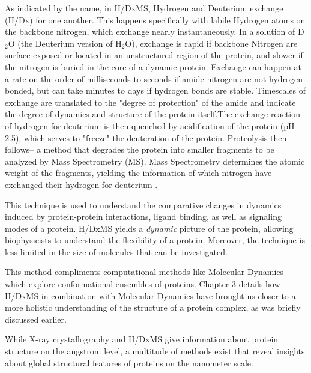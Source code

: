 \documentclass[12pt]{ucsddissertation}
\begin{document}
\begin{dissertationintroduction}
As indicated by the name, in H/DxMS, Hydrogen and Deuterium exchange (H/Dx) for one another. This happens specifically with labile Hydrogen atoms on the backbone nitrogen, which exchange nearly instantaneously.  In a solution of D$_{2}$O (the Deuterium version of H$_{2}$O), exchange is rapid if backbone Nitrogen are surface-exposed or located in an unstructured region of the protein, and slower if the nitrogen is buried in the core of a dynamic protein. Exchange can happen at a rate on the order of milliseconds to seconds if amide nitrogen are not hydrogen bonded, but can take minutes to days if hydrogen bonds are stable. Timescales of exchange are translated to the  "degree of protection" of the amide and indicate the degree of dynamics and structure of the protein itself.The exchange reaction of hydrogen for deuterium is then quenched by acidification of the protein (pH ~ 2.5), which serves to "freeze" the deuteration of the protein.  Proteolysis then follows-- a method that degrades the protein into smaller fragments to be analyzed by Mass Spectrometry (MS). Mass Spectrometry determines the atomic weight of the fragments, yielding the information of which nitrogen have exchanged their hydrogen for deuterium \cite{Konermann2011}. 

This technique is used to understand the comparative changes in dynamics induced by protein-protein interactions, ligand binding, as well as signaling modes of a protein\cite{Harrison2016}. H/DxMS yields a \textit{dynamic} picture of the protein, allowing biophysicists to understand the flexibility of a protein. Moreover, the technique is less limited in the size of molecules that can be investigated. 

This method compliments computational methods like Molecular Dynamics which explore conformational ensembles of proteins. Chapter 3  details how H/DxMS in combination with Molecular Dynamics have brought us closer to a more holistic understanding of the structure of a protein complex, as was briefly discussed earlier. 

While X-ray crystallography and H/DxMS give information about protein structure on the angstrom level, a multitude of methods exist that reveal insights about global structural features of proteins on the nanometer scale.


\end{dissertationintroduction}
\end{document}

